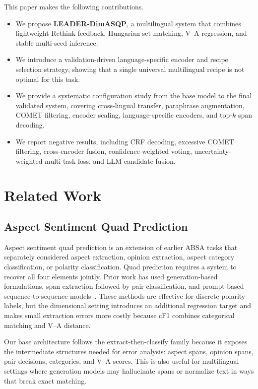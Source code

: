 \documentclass[runningheads]{llncs}
\begin{document}
This paper makes the following contributions.
\begin{itemize}[leftmargin=*,itemsep=2pt,topsep=2pt]
  \item We propose \textbf{LEADER-DimASQP}, a multilingual system that
  combines lightweight Rethink feedback, Hungarian set matching, V--A
  regression, and stable multi-seed inference.
  \item We introduce a validation-driven language-specific encoder and
  recipe selection strategy, showing that a single universal
  multilingual recipe is not optimal for this task.
  \item We provide a systematic configuration study from the base model
  to the final validated system, covering cross-lingual transfer,
  paraphrase augmentation, COMET
  filtering, encoder scaling, language-specific encoders, and top-$k$
  span decoding.
  \item We report negative results, including CRF decoding, excessive
  COMET filtering, cross-encoder fusion, confidence-weighted voting,
  uncertainty-weighted multi-task loss, and LLM candidate fusion.
\end{itemize}

\section{Related Work}

\subsection{Aspect Sentiment Quad Prediction}

Aspect sentiment quad prediction is an extension of earlier ABSA
tasks that separately considered aspect extraction, opinion extraction,
aspect category classification, or polarity classification. Quad
prediction requires a system to recover all four elements jointly.
Prior work has used generation-based formulations, span extraction
followed by pair classification, and prompt-based sequence-to-sequence
models~\cite{cai2021acos,zhang2021asqp}. These methods are effective for discrete polarity labels, but
the dimensional setting introduces an additional regression target and
makes small extraction errors more costly because cF1 combines
categorical matching and V--A distance.

Our base architecture follows the extract-then-classify family because
it exposes the intermediate structures needed for error analysis:
aspect spans, opinion spans, pair decisions, categories, and V--A
scores. This is also useful for multilingual settings where generation
models may hallucinate spans or normalize text in ways that break exact
matching.
\end{document}
